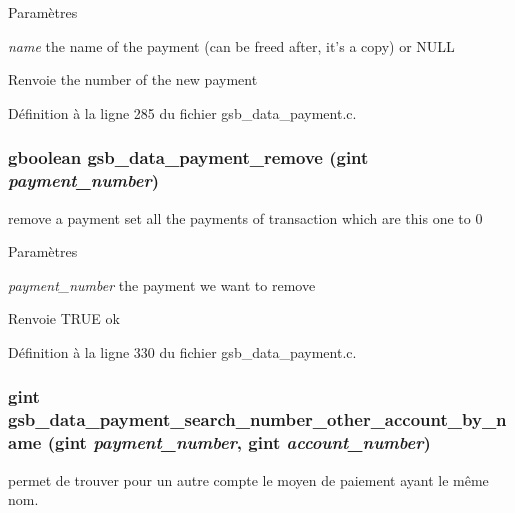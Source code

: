 \begin{DoxyParams}{Paramètres}
\item[{\em name}]the name of the payment (can be freed after, it's a copy) or NULL\end{DoxyParams}
\begin{DoxyReturn}{Renvoie}
the number of the new payment 
\end{DoxyReturn}


Définition à la ligne 285 du fichier gsb\_\-data\_\-payment.c.

\subsubsection[{gsb\_\-data\_\-payment\_\-remove}]{\setlength{\rightskip}{0pt plus 5cm}gboolean gsb\_\-data\_\-payment\_\-remove (gint {\em payment\_\-number})}\label{gsb__data__payment_8h_ace280b004905bd21d550f4e1d15e95bb}
remove a payment set all the payments of transaction which are this one to 0


\begin{DoxyParams}{Paramètres}
\item[{\em payment\_\-number}]the payment we want to remove\end{DoxyParams}
\begin{DoxyReturn}{Renvoie}
TRUE ok 
\end{DoxyReturn}


Définition à la ligne 330 du fichier gsb\_\-data\_\-payment.c.

\subsubsection[{gsb\_\-data\_\-payment\_\-search\_\-number\_\-other\_\-account\_\-by\_\-name}]{\setlength{\rightskip}{0pt plus 5cm}gint gsb\_\-data\_\-payment\_\-search\_\-number\_\-other\_\-account\_\-by\_\-name (gint {\em payment\_\-number}, \/  gint {\em account\_\-number})}\label{gsb__data__payment_8h_a76cc59b81186e59c739cc0eb7727255d}
permet de trouver pour un autre compte le moyen de paiement ayant le même nom.


